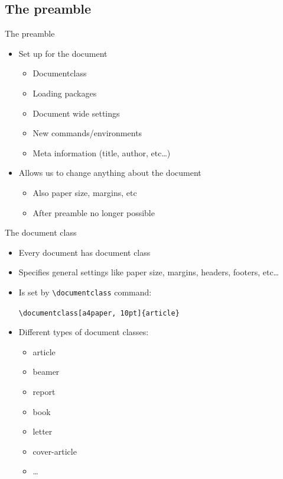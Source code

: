 \documentclass{beamer}
\begin{document}
\subsection{The preamble}
\begin{frame}{The preamble}
    \begin{itemize}
        \item Set up for the document
              \begin{itemize}
                  \item Documentclass
                  \item Loading packages
                  \item Document wide settings
                  \item New commands/environments
                  \item Meta information (title, author, etc\ldots)
              \end{itemize}
        \item Allows us to change anything about the document
              \begin{itemize}
                  \item Also paper size, margins, etc
                  \item After preamble no longer possible
              \end{itemize}
    \end{itemize}
\end{frame}

\begin{frame}[fragile]{The document class}
    \begin{itemize}
        \item Every document has document class
        \item Specifies general settings like paper size, margins, headers,
              footers, etc\ldots
        \item Is set by \lstinline+\documentclass+ command:

              \lstinline+\documentclass[a4paper, 10pt]{article}+
        \item Different types of document classes:
              \begin{itemize}
                  \item article
                  \item beamer
                  \item report
                  \item book
                  \item letter
                  \item cover-article
                  \item \ldots
              \end{itemize}
    \end{itemize}
\end{frame}
\end{document}
